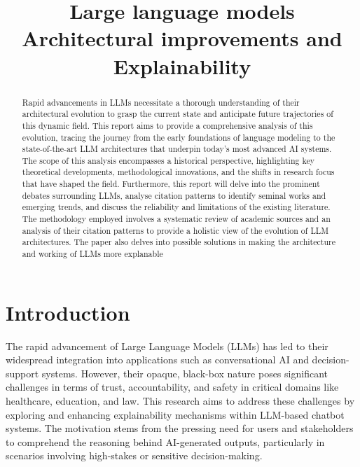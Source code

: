 \documentclass[conference]{IEEEtran}
\begin{document}
\title{Large language models \\ Architectural improvements and Explainability}

\author{
}
\maketitle

\begin{abstract}
Rapid advancements in LLMs necessitate a thorough understanding of their architectural evolution to grasp the current state and anticipate future trajectories of this dynamic field. This report aims to provide a comprehensive analysis of this evolution,
tracing the journey from the early foundations of language modeling to the state-of-the-art
LLM architectures that underpin today's most advanced AI systems. The scope of this
analysis encompasses a historical perspective, highlighting key theoretical developments,
methodological innovations, and the shifts in research focus that have shaped the field.
Furthermore, this report will delve into the prominent debates surrounding LLMs, analyse
citation patterns to identify seminal works and emerging trends, and discuss the reliability and limitations of the existing literature. The methodology employed involves a systematic review of academic sources and an analysis of their citation patterns to provide a holistic view of the evolution of LLM architectures. 
The paper also delves into possible solutions in making the architecture and working of LLMs more explanable
\end{abstract}

\section{Introduction}
The rapid advancement of Large Language Models (LLMs) has led to their widespread integration into applications such as conversational AI and decision-support systems. However, their opaque, black-box nature poses significant challenges in terms of trust, accountability, and safety in critical domains like healthcare, education, and law. This research aims to address these challenges by exploring and enhancing explainability mechanisms within LLM-based chatbot systems. The motivation stems from the pressing need for users and stakeholders to comprehend the reasoning behind AI-generated outputs, particularly in scenarios involving high-stakes or sensitive decision-making.
\end{document}
